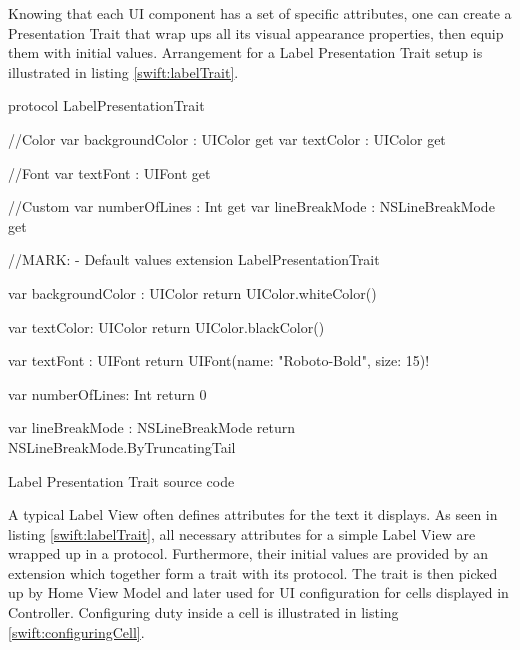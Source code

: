 \documentclass[11pt,a4paper,oneside,article]{memoir}
\begin{document}
Knowing that each UI component has a set of specific attributes, one can create a Presentation Trait that wrap ups all its visual appearance properties, then equip them with initial values. Arrangement for a Label Presentation Trait setup is illustrated in listing \ref{swift:labelTrait}.

\begin{listing}[H]
\begin{SwiftCode}
protocol LabelPresentationTrait {

    //Color 
    var backgroundColor : UIColor { get }
    var textColor : UIColor { get }
    
    //Font
    var textFont : UIFont { get }
    
    //Custom
    var numberOfLines : Int { get }
    var lineBreakMode : NSLineBreakMode { get }
}

//MARK: - Default values
extension LabelPresentationTrait {

    var backgroundColor : UIColor {
        return UIColor.whiteColor()
    }
    
    var textColor: UIColor {
        return UIColor.blackColor()
    }
    
    var textFont : UIFont {
        return UIFont(name: "Roboto-Bold", size: 15)!
    }
    
    var numberOfLines: Int {
        return 0
    }
    
    var lineBreakMode : NSLineBreakMode {
        return NSLineBreakMode.ByTruncatingTail
    }
}
\end{SwiftCode}
\caption{Label Presentation Trait source code}
\label{swift:labelTrait}
\end{listing}

A typical Label View often defines attributes for the text it displays.  As seen in listing \ref{swift:labelTrait}, all necessary attributes for a simple Label View are wrapped up in a protocol. Furthermore, their initial values are provided by an extension which together form a \gls{trait} with its protocol. The \gls{trait} is then picked up by Home View Model and later used for UI configuration for cells displayed in Controller. Configuring duty inside a cell is illustrated in listing \ref{swift:configuringCell}.
\end{document}
